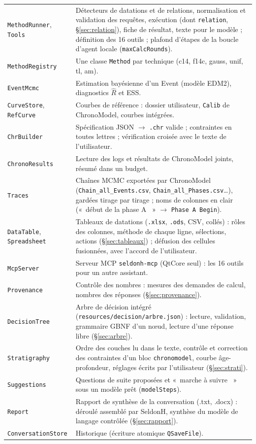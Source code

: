 \documentclass[11pt,a4paper]{article}
\providecommand{\og}{«~}\providecommand{\fg}{\unskip~»}
\newcommand{\code}[1]{\texttt{\small #1}}
\begin{document}
\begin{center}
\begin{tabularx}{\textwidth}{@{}l X@{}}
\code{MethodRunner}, \code{Tools} & Détecteurs de datations et de relations, normalisation et validation des
  requêtes, exécution (dont \code{relation}, §\ref{sec:relation}), fiche de résultat, texte pour le modèle ; définition
  des 16 outils ; plafond d'étapes de la boucle d'agent locale (\code{maxCalcRounds}). \\
\code{MethodRegistry} & Une classe \code{Method} par technique (c14, f14c, gauss, unif, tl, am). \\
\code{EventMcmc} & Estimation bayésienne d'un Event (modèle EDM2), diagnostics $\hat R$ et ESS. \\
\code{CurveStore}, \code{RefCurve} & Courbes de référence : dossier utilisateur, \code{Calib} de ChronoModel, courbes
  intégrées. \\
\code{ChrBuilder} & Spécification JSON $\rightarrow$ \code{.chr} valide ; contraintes en toutes lettres ;
  vérification croisée avec le texte de l'utilisateur. \\
\code{ChronoResults} & Lecture des logs et résultats de ChronoModel joints, résumé dans un budget. \\
\code{Traces} & Chaînes MCMC exportées par ChronoModel (\code{Chain\_all\_Events.csv}, \code{Chain\_all\_Phases.csv}\dots),
  gardées tirage par tirage ; noms de colonnes en clair (\og début de la phase A \fg{} $\rightarrow$
  \code{Phase A Begin}). \\
\code{DataTable}, \code{Spreadsheet} & Tableaux de datations (\code{.xlsx}, \code{.ods}, CSV, collés) : rôles des
  colonnes, méthode de chaque ligne, sélections, actions (§\ref{sec:tableaux}) ; défusion des cellules fusionnées,
  avec l'accord de l'utilisateur. \\
\code{McpServer} & Serveur MCP \code{seldonh-mcp} (QtCore seul) : les 16 outils pour un autre assistant. \\
\code{Provenance} & Contrôle des nombres : mesures des demandes de calcul, nombres des réponses
  (§\ref{sec:provenance}). \\
\code{DecisionTree} & Arbre de décision intégré (\code{resources/decision/arbre.json}) : lecture, validation,
  grammaire GBNF d'un nœud, lecture d'une réponse libre (§\ref{sec:arbre}). \\
\code{Stratigraphy} & Ordre des couches lu dans le texte, contrôle et correction des contraintes d'un bloc
  \code{chronomodel}, courbe âge-profondeur, réglages écrits par l'utilisateur (§\ref{sec:strati}). \\
\code{Suggestions} & Questions de suite proposées et \og marche à suivre \fg{} sous un modèle prêt (\code{modelSteps}). \\
\code{Report} & Rapport de synthèse de la conversation (.txt, .docx) : déroulé assemblé par SeldonH, synthèse du
  modèle de langage contrôlée (§\ref{sec:rapport}). \\
\code{ConversationStore} & Historique (écriture atomique \code{QSaveFile}). \\
\bottomrule
\end{tabularx}
\end{center}
\end{document}
